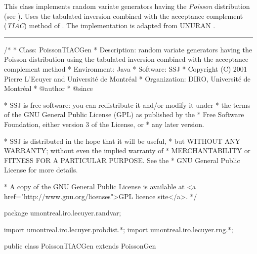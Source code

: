 
This class implements random variate generators having the {\em Poisson\/} 
distribution (see ). 
Uses the tabulated inversion combined with the acceptance complement 
({\em TIAC\/}) method of \cite{rAHR82b}.
The implementation is adapted from UNURAN \cite{iLEY02a}. 


\bigskip\hrule

\begin{code}
\begin{hide}
/*
 * Class:        PoissonTIACGen
 * Description:  random variate generators having the Poisson distribution 
                 using the tabulated inversion combined with the acceptance
                 complement method
 * Environment:  Java
 * Software:     SSJ 
 * Copyright (C) 2001  Pierre L'Ecuyer and Université de Montréal
 * Organization: DIRO, Université de Montréal
 * @author       
 * @since

 * SSJ is free software: you can redistribute it and/or modify it under
 * the terms of the GNU General Public License (GPL) as published by the
 * Free Software Foundation, either version 3 of the License, or
 * any later version.

 * SSJ is distributed in the hope that it will be useful,
 * but WITHOUT ANY WARRANTY; without even the implied warranty of
 * MERCHANTABILITY or FITNESS FOR A PARTICULAR PURPOSE.  See the
 * GNU General Public License for more details.

 * A copy of the GNU General Public License is available at
   <a href="http://www.gnu.org/licenses">GPL licence site</a>.
 */
\end{hide}
package umontreal.iro.lecuyer.randvar;\begin{hide}
import umontreal.iro.lecuyer.probdist.*;
import umontreal.iro.lecuyer.rng.*;\end{hide}
   
public class PoissonTIACGen extends PoissonGen \begin{hide} {
 
   private double[] pp    = new double[36];
   private int[]    llref = {0};
   private static double[] staticPP    = new double[36];
   private static int[]    staticllref = {0};
   // Used by TIAC, avoid creating a table upon each call.
\end{hide}
\end{code}

